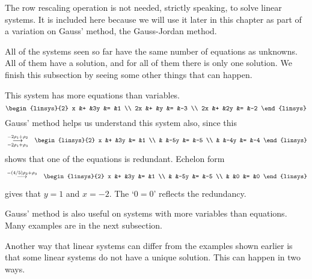 The row rescaling operation is 
not needed, strictly speaking, to solve linear systems.  
It is included here because we will use it 
later in this chapter as part of a variation on Gauss' method, 
the Gauss-Jordan method.

All of the systems seen so far have the same number of equations as unknowns.
All of them have a solution, and for all of them there is only one solution.
We finish this subsection by seeing
some other things that can happen.

\begin{example} \label{ex:MoreEqsThanUnks}
This system 
has more equations than variables.
\begin{equation*}
    \begin{linsys}{2}
      x  &+  &3y  &=  &1  \\
     2x  &+  &y   &=  &-3 \\
     2x  &+  &2y  &=  &-2 
    \end{linsys}  
\end{equation*}
Gauss' method helps us understand this system also, since this
  \begin{eqnarray*}
    &\grstep[-2\rho_1 +\rho_3]{-2\rho_1 +\rho_2}
    &\begin{linsys}{2}
       x  &+  &3y  &=  &1  \\
          &   &-5y &=  &-5 \\
          &   &-4y &=  &-4 
     \end{linsys}
   \end{eqnarray*}
shows that one of the equations is redundant.
Echelon form
\begin{eqnarray*}
    &\grstep{-(4/5)\rho_2 +\rho_3}
    &\begin{linsys}{2}
       x  &+  &3y  &=  &1  \\
          &   &-5y &=  &-5 \\
          &   &0   &=  &0  
     \end{linsys}
   \end{eqnarray*}
gives that \( y=1 \) and \( x=-2 \).
The `\( 0=0 \)' reflects the redundancy.
\end{example}

Gauss' method is also useful on systems with more variables than equations.
Many examples are in the next subsection.

Another way that linear systems can differ from the examples shown earlier 
is that some linear systems do not have a unique solution.
This can happen in two ways.

